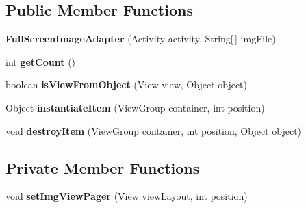 \subsection*{Public Member Functions}
\begin{DoxyCompactItemize}
\item 
{\bfseries Full\+Screen\+Image\+Adapter} (Activity activity, String\mbox{[}$\,$\mbox{]} img\+File)\hypertarget{classcom_1_1example_1_1sebastian_1_1tindertp_1_1animationTools_1_1FullScreenImageAdapter_a9407a5197bcab10cbe809237a640f905}{}\label{classcom_1_1example_1_1sebastian_1_1tindertp_1_1animationTools_1_1FullScreenImageAdapter_a9407a5197bcab10cbe809237a640f905}

\item 
int {\bfseries get\+Count} ()\hypertarget{classcom_1_1example_1_1sebastian_1_1tindertp_1_1animationTools_1_1FullScreenImageAdapter_a04a1dc1c283ad2d3d6c77f7dc351d061}{}\label{classcom_1_1example_1_1sebastian_1_1tindertp_1_1animationTools_1_1FullScreenImageAdapter_a04a1dc1c283ad2d3d6c77f7dc351d061}

\item 
boolean {\bfseries is\+View\+From\+Object} (View view, Object object)\hypertarget{classcom_1_1example_1_1sebastian_1_1tindertp_1_1animationTools_1_1FullScreenImageAdapter_a187d0f9df7d3ed5009c280306f32e22f}{}\label{classcom_1_1example_1_1sebastian_1_1tindertp_1_1animationTools_1_1FullScreenImageAdapter_a187d0f9df7d3ed5009c280306f32e22f}

\item 
Object {\bfseries instantiate\+Item} (View\+Group container, int position)\hypertarget{classcom_1_1example_1_1sebastian_1_1tindertp_1_1animationTools_1_1FullScreenImageAdapter_a928053683a38bbf7a604d480b4c8e553}{}\label{classcom_1_1example_1_1sebastian_1_1tindertp_1_1animationTools_1_1FullScreenImageAdapter_a928053683a38bbf7a604d480b4c8e553}

\item 
void {\bfseries destroy\+Item} (View\+Group container, int position, Object object)\hypertarget{classcom_1_1example_1_1sebastian_1_1tindertp_1_1animationTools_1_1FullScreenImageAdapter_ad1736ed3796ba432abe2260e0db76054}{}\label{classcom_1_1example_1_1sebastian_1_1tindertp_1_1animationTools_1_1FullScreenImageAdapter_ad1736ed3796ba432abe2260e0db76054}

\end{DoxyCompactItemize}
\subsection*{Private Member Functions}
\begin{DoxyCompactItemize}
\item 
void {\bfseries set\+Img\+View\+Pager} (View view\+Layout, int position)\hypertarget{classcom_1_1example_1_1sebastian_1_1tindertp_1_1animationTools_1_1FullScreenImageAdapter_a54daf4a99998627617a3ce43eb02a18a}{}\label{classcom_1_1example_1_1sebastian_1_1tindertp_1_1animationTools_1_1FullScreenImageAdapter_a54daf4a99998627617a3ce43eb02a18a}

\end{DoxyCompactItemize}
